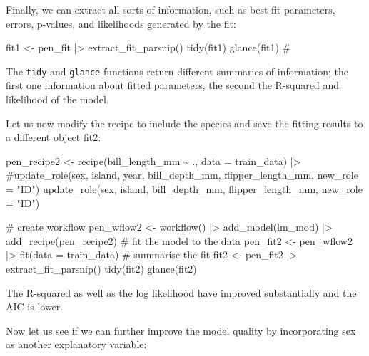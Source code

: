 \documentclass[
  letterpaper,
  DIV=11,
  numbers=noendperiod]{scrreprt}
\newenvironment{Shaded}{\begin{snugshade}}{\end{snugshade}}
\newcommand{\NormalTok}[1]{\textcolor[rgb]{0.00,0.23,0.31}{#1}}
\begin{document}
Finally, we can extract all sorts of information, such as best-fit
parameters, errors, p-values, and likelihoods generated by the fit:

\begin{Shaded}
\begin{Highlighting}[]
\NormalTok{fit1 \textless{}{-} pen\_fit |\textgreater{} }
\NormalTok{  extract\_fit\_parsnip() }
\NormalTok{tidy(fit1)}
\NormalTok{glance(fit1) \# }
\end{Highlighting}
\end{Shaded}

The \texttt{tidy} and \texttt{glance} functions return different
summaries of information; the first one information about fitted
parameters, the second the R-squared and likelihood of the model.

Let us now modify the recipe to include the species and save the fitting
results to a different object fit2:

\begin{Shaded}
\begin{Highlighting}[]
\NormalTok{pen\_recipe2 \textless{}{-} }
\NormalTok{  recipe(bill\_length\_mm \textasciitilde{} ., data = train\_data) |\textgreater{} }
\NormalTok{  \#update\_role(sex, island, year, bill\_depth\_mm, flipper\_length\_mm, new\_role = "ID")}
\NormalTok{  update\_role(sex, island, bill\_depth\_mm, flipper\_length\_mm, new\_role = "ID") }

\NormalTok{\# create workflow}
\NormalTok{pen\_wflow2 \textless{}{-} }
\NormalTok{  workflow() |\textgreater{} }
\NormalTok{  add\_model(lm\_mod) |\textgreater{} }
\NormalTok{  add\_recipe(pen\_recipe2)}
\NormalTok{\# fit the model to the data}
\NormalTok{pen\_fit2 \textless{}{-} }
\NormalTok{  pen\_wflow2 |\textgreater{} }
\NormalTok{  fit(data = train\_data)}
\NormalTok{\# summarise the fit}
\NormalTok{fit2 \textless{}{-} pen\_fit2 |\textgreater{} }
\NormalTok{  extract\_fit\_parsnip() }
\NormalTok{tidy(fit2)}
\NormalTok{glance(fit2) }
\end{Highlighting}
\end{Shaded}

The R-squared as well as the log likelihood have improved substantially
and the AIC is lower.

Now let us see if we can further improve the model quality by
incorporating sex as another explanatory variable:
\end{document}
